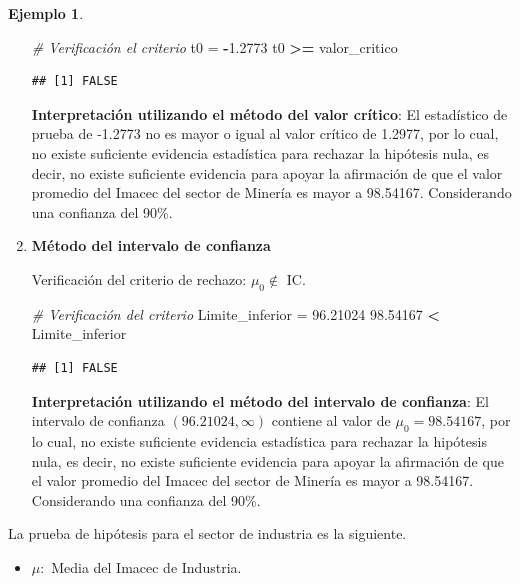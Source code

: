 \documentclass[
  11pt,
]{book}
\newenvironment{Shaded}{\begin{snugshade}}{\end{snugshade}}
\newcommand{\CommentTok}[1]{\textcolor[rgb]{0.56,0.35,0.01}{\textit{#1}}}
\newcommand{\FloatTok}[1]{\textcolor[rgb]{0.00,0.00,0.81}{#1}}
\newcommand{\NormalTok}[1]{#1}
\newcommand{\OtherTok}[1]{\textcolor[rgb]{0.56,0.35,0.01}{#1}}
\newcommand{\SpecialCharTok}[1]{\textcolor[rgb]{0.81,0.36,0.00}{\textbf{#1}}}
\providecommand{\tightlist}{%
  \setlength{\itemsep}{0pt}\setlength{\parskip}{0pt}}
\theoremstyle{definition}
\theoremstyle{definition}
\newtheorem{example}{Ejemplo}[chapter]
\theoremstyle{definition}
\theoremstyle{definition}
\theoremstyle{remark}
\begin{document}
\begin{example}
\begin{enumerate}
\begin{Shaded}
\begin{Highlighting}[]
\CommentTok{\# Verificación el criterio}
\NormalTok{t0 }\OtherTok{=} \SpecialCharTok{{-}}\FloatTok{1.2773}
\NormalTok{t0 }\SpecialCharTok{\textgreater{}=}\NormalTok{ valor\_critico}
\end{Highlighting}
\end{Shaded}

\begin{verbatim}
## [1] FALSE
\end{verbatim}

  \textbf{Interpretación utilizando el método del valor crítico}: El estadístico de prueba de -1.2773 no es mayor o igual al valor crítico de 1.2977, por lo cual, no existe suficiente evidencia estadística para rechazar la hipótesis nula, es decir, no existe suficiente evidencia para apoyar la afirmación de que el valor promedio del Imacec del sector de Minería es mayor a 98.54167. Considerando una confianza del 90\%.
\item
  \textbf{Método del intervalo de confianza}

  Verificación del criterio de rechazo: \(\mu_0 \notin\) IC.

\begin{Shaded}
\begin{Highlighting}[]
\CommentTok{\# Verificación del criterio}
\NormalTok{Limite\_inferior }\OtherTok{=} \FloatTok{96.21024}
\FloatTok{98.54167} \SpecialCharTok{\textless{}}\NormalTok{ Limite\_inferior}
\end{Highlighting}
\end{Shaded}

\begin{verbatim}
## [1] FALSE
\end{verbatim}

  \textbf{Interpretación utilizando el método del intervalo de confianza}: El intervalo de confianza \((96.21024, \infty)\) contiene al valor de \(\mu_0 = 98.54167\), por lo cual, no existe suficiente evidencia estadística para rechazar la hipótesis nula, es decir, no existe suficiente evidencia para apoyar la afirmación de que el valor promedio del Imacec del sector de Minería es mayor a 98.54167. Considerando una confianza del 90\%.
\end{enumerate}

La prueba de hipótesis para el sector de industria es la siguiente.

\begin{itemize}
\tightlist
\item
  \(\mu:\) Media del Imacec de Industria.
\end{itemize}


\end{example}
\end{document}
